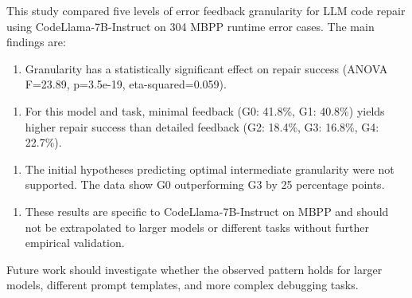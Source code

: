 
This study compared five levels of error feedback granularity for LLM code repair using CodeLlama-7B-Instruct on 304 MBPP runtime error cases. The main findings are:

\begin{enumerate}
\item Granularity has a statistically significant effect on repair success (ANOVA F=23.89, p=3.5e-19, eta-squared=0.059).
\end{enumerate}

\begin{enumerate}
\item For this model and task, minimal feedback (G0: 41.8\%, G1: 40.8\%) yields higher repair success than detailed feedback (G2: 18.4\%, G3: 16.8\%, G4: 22.7\%).
\end{enumerate}

\begin{enumerate}
\item The initial hypotheses predicting optimal intermediate granularity were not supported. The data show G0 outperforming G3 by 25 percentage points.
\end{enumerate}

\begin{enumerate}
\item These results are specific to CodeLlama-7B-Instruct on MBPP and should not be extrapolated to larger models or different tasks without further empirical validation.
\end{enumerate}

Future work should investigate whether the observed pattern holds for larger models, different prompt templates, and more complex debugging tasks.
